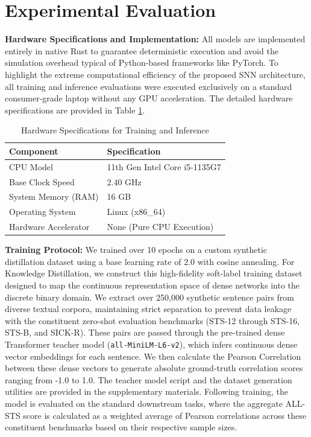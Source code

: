 \documentclass[preprint,12pt]{elsarticle}
\begin{document}
\section{Experimental Evaluation}

\textbf{Hardware Specifications and Implementation:} All models are implemented entirely in native Rust to guarantee deterministic execution and avoid the simulation overhead typical of Python-based frameworks like PyTorch. To highlight the extreme computational efficiency of the proposed SNN architecture, all training and inference evaluations were executed exclusively on a standard consumer-grade laptop without any GPU acceleration. The detailed hardware specifications are provided in Table \ref{tab:hardware_specs}.

\begin{table}[t!]
\caption{Hardware Specifications for Training and Inference}
\label{tab:hardware_specs}
\begin{tabular}{ll}
\toprule
\textbf{Component} & \textbf{Specification} \\
\midrule
CPU Model & 11th Gen Intel Core i5-1135G7 \\
Base Clock Speed & 2.40 GHz \\
System Memory (RAM) & 16 GB \\
Operating System & Linux (x86\_64) \\
Hardware Accelerator & None (Pure CPU Execution) \\
\bottomrule
\end{tabular}
\end{table}

\textbf{Training Protocol:} We trained over 10 epochs on a custom synthetic distillation dataset using a base learning rate of $2.0$ with cosine annealing. For Knowledge Distillation, we construct this high-fidelity soft-label training dataset designed to map the continuous representation space of dense networks into the discrete binary domain. We extract over 250,000 synthetic sentence pairs from diverse textual corpora, maintaining strict separation to prevent data leakage with the constituent zero-shot evaluation benchmarks (STS-12 through STS-16, STS-B, and SICK-R). These pairs are passed through the pre-trained dense Transformer teacher model (\texttt{all-MiniLM-L6-v2}), which infers continuous dense vector embeddings for each sentence. We then calculate the Pearson Correlation between these dense vectors to generate absolute ground-truth correlation scores ranging from -1.0 to 1.0. The teacher model script and the dataset generation utilities are provided in the supplementary materials. Following training, the model is evaluated on the standard downstream tasks, where the aggregate ALL-STS score is calculated as a weighted average of Pearson correlations across these constituent benchmarks based on their respective sample sizes.
\end{document}
